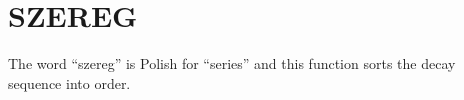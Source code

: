 \section{SZEREG}
\label{sect:szereg}

\noindent The word ``szereg'' is Polish for ``series'' and this function sorts
the decay sequence into order.\\

